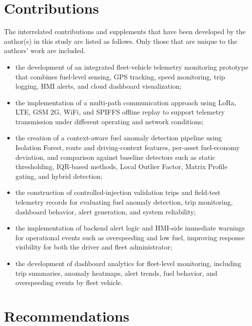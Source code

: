 \section{Contributions}

The interrelated  contributions and supplements that have been developed by the author(s) in this study are listed as follows. Only those that are unique to the authors' work are included.

\begin{itemize}
  \item the development of an integrated fleet-vehicle telemetry monitoring prototype that combines fuel-level sensing, GPS tracking, speed monitoring, trip logging, HMI alerts, and cloud dashboard visualization;

  \item the implementation of a multi-path communication approach using LoRa, LTE, GSM 2G, WiFi, and SPIFFS offline replay to support telemetry transmission under different operating and network conditions;

  \item the creation of a context-aware fuel anomaly detection pipeline using Isolation Forest, route and driving-context features, per-asset fuel-economy deviation, and comparison against baseline detectors such as static thresholding, IQR-based methods, Local Outlier Factor, Matrix Profile gating, and hybrid detection;

  \item the construction of controlled-injection validation trips and field-test telemetry records for evaluating fuel anomaly detection, trip monitoring, dashboard behavior, alert generation, and system reliability;

  \item the implementation of backend alert logic and HMI-side immediate warnings for operational events such as overspeeding and low fuel, improving response visibility for both the driver and fleet administrator;

  \item the development of dashboard analytics for fleet-level monitoring, including trip summaries, anomaly heatmaps, alert trends, fuel behavior, and overspeeding events by fleet vehicle.
\end{itemize}

\section{Recommendations}
\label{sec:concluding_recommendations}

